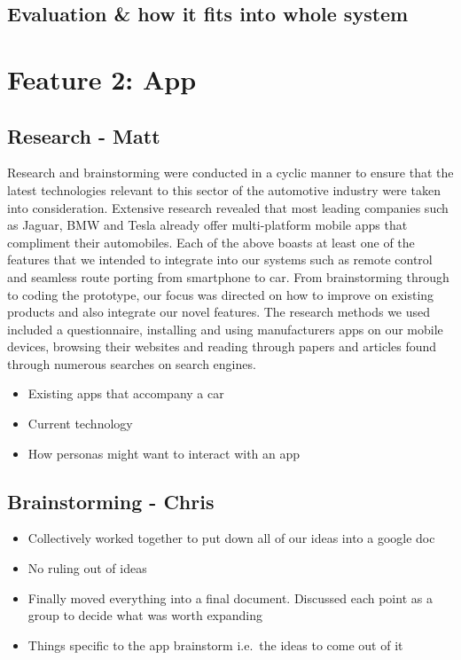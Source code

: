 \documentclass{article}
\begin{document}
\subsection{Evaluation \& how it fits into whole system}\label{ssec:nav-evaluation}




%
%
\section{Feature 2: App}\label{sec:app}

\subsection{Research - Matt}\label{ssec:app-research}
Research and brainstorming were conducted in a cyclic manner to ensure that the latest technologies relevant to this sector of the automotive industry were taken into consideration. Extensive research revealed that most leading companies such as Jaguar, BMW and Tesla already offer multi-platform mobile apps that compliment their automobiles. Each of the above boasts at least one of the features that we intended to integrate into our systems such as remote control and seamless route porting from smartphone to car. From brainstorming through to coding the prototype, our focus was directed on how to improve on existing products and also integrate our novel features.
The research methods we used included a questionnaire, installing and using manufacturers apps on our mobile devices, browsing their websites and reading through papers and articles found through numerous searches on search engines.
	\begin{itemize}
		\item Existing apps that accompany a car
        \item Current technology
		\item How personas might want to interact with an app
	\end{itemize}
\subsection{Brainstorming - Chris}\label{ssec:app-brainstorming}

	\begin{itemize}
		\item Collectively worked together to put down all of our ideas into a google doc
		\item No ruling out of ideas
		\item Finally moved everything into a final document. Discussed each point as a group to decide what was worth expanding
        \item Things specific to the app brainstorm i.e.\ the ideas to come out of it
	\end{itemize}
\end{document}
